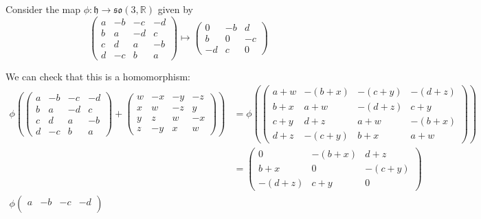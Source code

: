 \documentclass[12pt]{article}
\newcommand{\R}{\mathbb{R}}
\newcommand{\h}{\mathfrak{h}}
\begin{document}
        Consider the map $\phi: \h \to \mathfrak{so}(3, \R)$ given by
        \[\begin{pmatrix}
            a & -b & -c & -d\\
            b & a & -d & c\\
            c & d & a & -b\\
            d & -c & b & a
        \end{pmatrix} \mapsto \begin{pmatrix}
            0 & -b & d\\
            b & 0 & -c\\
            -d & c & 0
        \end{pmatrix}\]

        We can check that this is a homomorphism:
        \begin{align*}
            \phi\left(\begin{pmatrix}
                a & -b & -c & -d\\
                b & a & -d & c\\
                c & d & a & -b\\
                d & -c & b & a
            \end{pmatrix} + \begin{pmatrix}
                w & -x & -y & -z\\
                x & w & -z & y\\
                y & z & w & -x\\
                z & -y & x & w
            \end{pmatrix}\right) &= \phi\left(\begin{pmatrix}
                a+w & -(b+x) & -(c+y) & -(d+z)\\
                b+x & a+w & -(d+z) & c+y\\
                c+y & d+z & a+w & -(b+x)\\
                d+z & -(c+y) & b+x & a+w
            \end{pmatrix}\right)\\ 
            &= \begin{pmatrix}
                0 & -(b+x) & d+z\\
                b+x & 0 & -(c+y)\\
                -(d+z) & c+y & 0
            \end{pmatrix}\\ 
            \phi\begin{pmatrix}
                a & -b & -c & -d\\

\end{pmatrix}
\end{align*}
\end{document}

